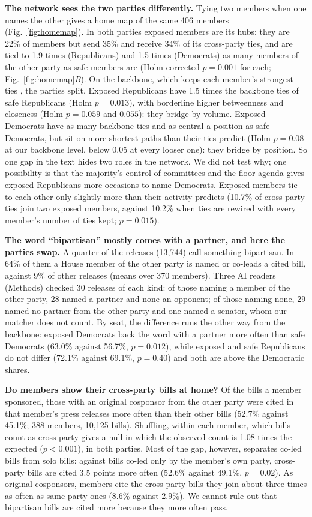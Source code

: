 \documentclass[9pt,twocolumn,twoside]{pnas-new}
\begin{document}
\textbf{The network sees the two parties differently.} Tying two members when one names the other gives a home map of
the same 406 members (Fig.~\ref{fig:homemap}). In both parties exposed members are its hubs: they are 22\% of members
but send 35\% and receive 34\% of its cross-party ties, and are tied to 1.9 times (Republicans) and 1.5 times
(Democrats) as many members of the other party as safe members are (Holm-corrected $p = 0.001$ for each;
Fig.~\ref{fig:homemap}\emph{B}). On the backbone, which keeps each member's strongest ties \cite{serrano2009}, the
parties split. Exposed Republicans have 1.5 times the backbone ties of safe Republicans (Holm $p = 0.013$), with
borderline higher betweenness and closeness (Holm $p = 0.059$ and $0.055$): they bridge by volume. Exposed Democrats
have as many backbone ties and as central a position as safe Democrats, but sit on more shortest paths than their ties
predict (Holm $p = 0.08$ at our backbone level, below 0.05 at every looser one): they bridge by position. So one gap in
the text hides two roles in the network. We did not test why; one possibility is that the majority's control of
committees and the floor agenda gives exposed Republicans more occasions to name Democrats. Exposed members tie to
each other only slightly more than their activity predicts (10.7\% of cross-party ties join two exposed members,
against 10.2\% when ties are rewired with every member's number of ties kept; $p = 0.015$).

\textbf{The word ``bipartisan'' mostly comes with a partner, and here the parties swap.} A quarter of the releases
(13,744) call something bipartisan. In 64\% of them a House member of the other party is named or co-leads a cited
bill, against 9\% of other releases (means over 370 members). Three AI readers (Methods) checked 30 releases of each kind:
of those naming a member of the other party, 28 named a partner and none an opponent; of those naming none, 29 named
no partner from the other party and one named a senator, whom our matcher does not count. By seat, the difference
runs the other way from the backbone: exposed Democrats back the word with a partner more often than safe Democrats
(63.0\% against 56.7\%, $p = 0.012$), while exposed and safe Republicans do not differ (72.1\% against 69.1\%,
$p = 0.40$) and both are above the Democratic shares.

\textbf{Do members show their cross-party bills at home?} Of the bills a member sponsored, those with an original
cosponsor from the other party were cited in that member's press releases more often than their other bills (52.7\%
against 45.1\%; 388 members, 10,125 bills). Shuffling, within each member, which bills count as cross-party gives a
null in which the observed count is 1.08 times the expected ($p < 0.001$), in both parties. Most of the gap, however,
separates co-led bills from solo bills: against bills co-led only by the member's own party, cross-party bills are
cited 3.5 points more often (52.6\% against 49.1\%, $p = 0.02$). As original cosponsors, members cite the cross-party
bills they join about three times as often as same-party ones (8.6\% against 2.9\%). We cannot rule out that
bipartisan bills are cited more because they more often pass.
\end{document}
